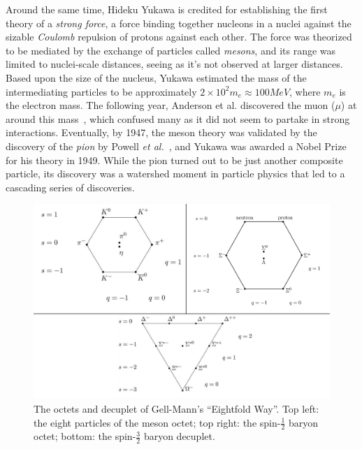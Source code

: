 Around the same time, Hideku Yukawa is credited for establishing the first theory of a \emph{strong force}, a force binding together nucleons in a nuclei against the sizable \emph{Coulomb} repulsion of protons against each other. The force was theorized to be mediated by the exchange of particles called \emph{mesons}, and its range was limited to nuclei-scale distances, seeing as it's not observed at larger distances. Based upon the size of the nucleus, Yukawa estimated the mass of the intermediating particles to be approximately $2 \times 10^2 m_e \approx 100 MeV$, where $m_e$ is the electron mass. The following year, Anderson et al. discovered the muon ($\mu$) at around this mass~\cite{Anderson:1936zz}, which confused many as it did not seem to partake in strong interactions. Eventually, by 1947, the meson theory was validated by the discovery of the \emph{pion} by Powell \emph{et al.}~\cite{Powell:1946pu}, and Yukawa was awarded a Nobel Prize for his theory in 1949. While the pion turned out to be just another composite particle, its discovery was a watershed moment in particle physics that led to a cascading series of discoveries. 
\begin{figure}
	\centering
	\includegraphics[width=5in]{figures/background/mesons_baryons.pdf}
	\caption{The octets and decuplet of Gell-Mann's ``Eightfold Way''. Top left: the eight particles of the meson octet; top right: the spin-$\frac{1}{2}$ baryon octet; bottom: the spin-$\frac{3}{2}$ baryon decuplet.}
	\label{fig:mesons-baryons}
\end{figure}

